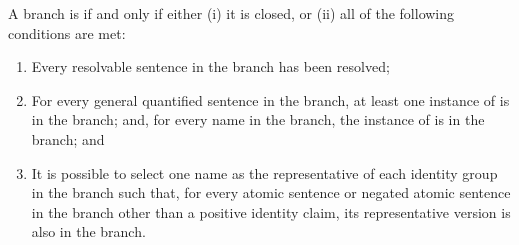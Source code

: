 A branch is  if and only if either (i) it is closed, or (ii) all of the following conditions are met:
\begin{enumerate}
\item Every resolvable sentence in the branch has been resolved;
\item For every general quantified sentence \metaA{} in the branch, at least one instance of \metaA{} is in the branch; and, for every name  in the branch, the  instance of \metaA{} is in the branch; and
\item It is possible to select one name as the representative of each identity group in the branch such that, for every atomic sentence or negated atomic sentence in the branch other than a positive identity claim, its representative version is also in the branch.
\end{enumerate}

\newpage

